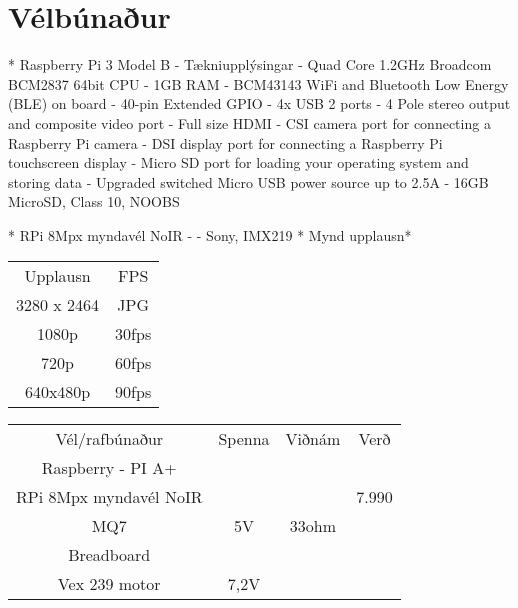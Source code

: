 \section{Vélbúnaður}
* Raspberry Pi 3 Model B - Tækniupplýsingar 
	- Quad Core 1.2GHz Broadcom BCM2837 64bit CPU
	- 1GB RAM
	- BCM43143 WiFi and Bluetooth Low Energy (BLE) on board
	- 40-pin Extended GPIO
	- 4x USB 2 ports
	- 4 Pole stereo output and composite video port
	- Full size HDMI
 	- CSI camera port for connecting a Raspberry Pi camera
	- DSI display port for connecting a Raspberry Pi touchscreen display
	- Micro SD port for loading your operating system and storing data
	- Upgraded switched Micro USB power source up to 2.5A
	- 16GB MicroSD, Class 10, NOOBS

* RPi 8Mpx myndavél NoIR -
	- Sony, IMX219
	* Mynd upplausn*
\begin{center}
\begin{tabular}{ |c|c| } 
 \hline
 Upplausn & FPS\\ 
 3280 x 2464 & JPG\\
1080p & 30fps\\
720p & 60fps\\ 
640x480p & 90fps\\
 \hline
\end{tabular}
\end{center}

\begin{center}
\begin{tabular}{ |c|c|c|c| } 
 \hline
 Vél/rafbúnaður & Spenna & Viðnám & Verð\\ 
 Raspberry - PI A+  & & \\ 
RPi 8Mpx myndavél NoIR & & & 7.990\\
 MQ7 & 5V & 33ohm &\\ 
 Breadboard & & \\
 Vex 239 motor & 7,2V & \\
 \hline
\end{tabular}
\end{center}
